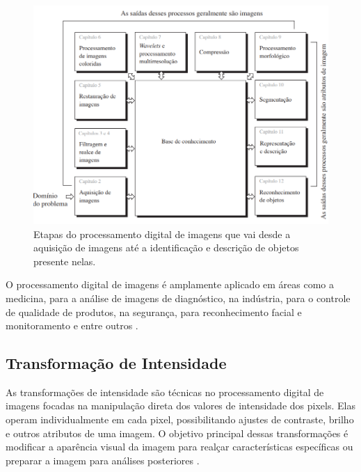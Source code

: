 \begin{figure}
    \centering   
    \includegraphics[width=\textwidth]{fig/PassosProcessamentoDigitalDeImagens.png}
    \caption{Etapas do processamento digital de imagens que vai desde a aquisição de imagens até a identificação e descrição de objetos presente nelas.}
    \label{etapasProcessamentoImagens}
\end{figure}

O processamento digital de imagens é amplamente aplicado em áreas como a medicina, para a análise de imagens de diagnóstico, na indústria, para o controle de qualidade de produtos, na segurança, para reconhecimento facial e monitoramento e entre outros \cite{gonzalez2010processamento}. %




\subsection{Transformação de Intensidade}


As transformações de intensidade são técnicas no processamento digital de imagens focadas na manipulação direta dos valores de intensidade dos pixels. Elas operam individualmente em cada pixel, possibilitando ajustes de contraste, brilho e outros atributos de uma imagem. O objetivo principal dessas transformações é modificar a aparência visual da imagem para realçar características específicas ou preparar a imagem para análises posteriores \cite{gonzalez2010processamento}.


